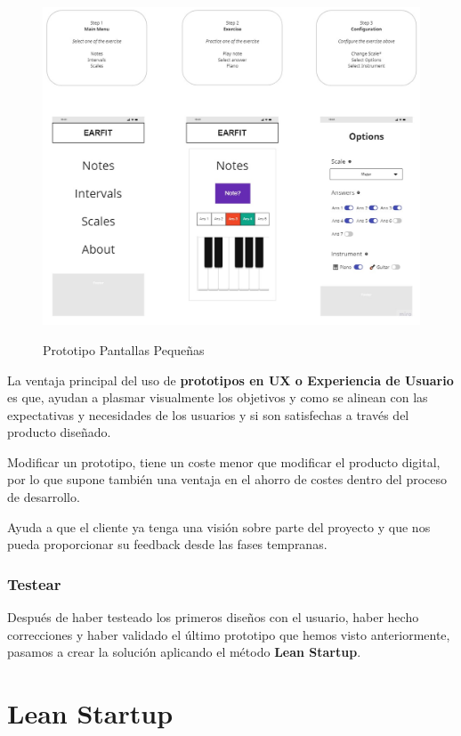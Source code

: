 \documentclass[12pt,twoside,titlepage]{report}
\begin{document}
\begin{figure}[H]
        \centering
        \includegraphics[scale=0.33]{Design Thinking/Prototipo/Small/Prototipo}
        \label{fig:PrototipoSmall}
        \caption{Prototipo Pantallas Pequeñas}
    \end{figure}

La ventaja principal del uso de \textbf{prototipos en UX o Experiencia de Usuario} es que, ayudan a plasmar visualmente los objetivos y como se alinean con las expectativas y necesidades de los usuarios y si son satisfechas a través del producto diseñado.

Modificar un prototipo, tiene un coste menor que modificar el producto digital, por lo que supone también una ventaja en el ahorro de costes dentro del proceso de desarrollo.

Ayuda a que el cliente ya tenga una visión sobre parte del proyecto y que nos pueda proporcionar su feedback desde las fases tempranas.

\subsubsection{Testear}

Después de haber testeado los primeros diseños con el usuario, haber hecho correcciones y haber validado el último prototipo que hemos visto anteriormente, pasamos a crear la solución aplicando el método \textbf{Lean Startup}.

\section{Lean Startup}
\end{document}
